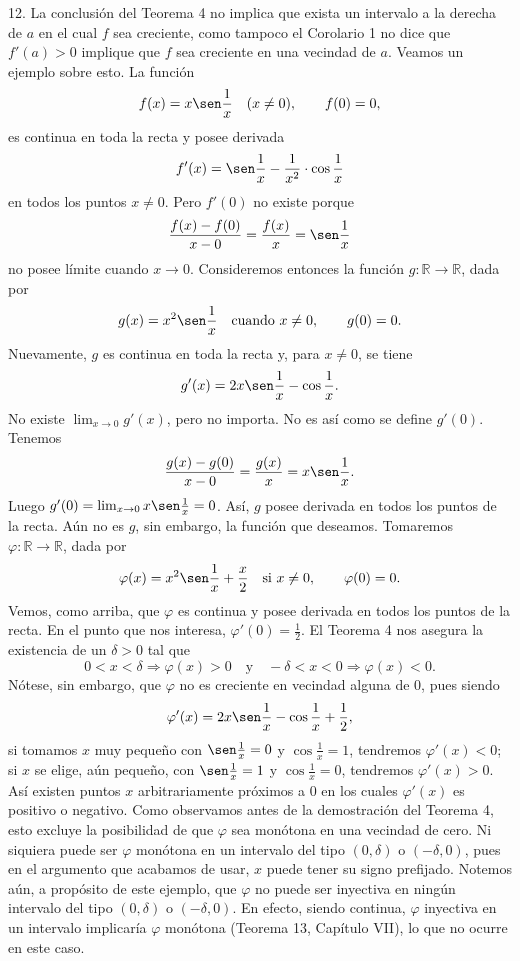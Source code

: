 \documentclass[12pt,oneside]{book}
\begin{document}
12. La conclusión del Teorema 4 no implica que exista un intervalo a la derecha de \( a \) en el cual \( f \) sea creciente, como tampoco el Corolario 1 no dice que \( f'(a) > 0 \) implique que \( f \) sea creciente en una vecindad de \( a \). Veamos un ejemplo sobre esto. La función
\[
f(x) = x \sen \frac{1}{x} \quad (x \neq 0), \qquad f(0) = 0,
\]
es continua en toda la recta y posee derivada
\[
f'(x) = \sen \frac{1}{x} - \frac{1}{x^2} \cdot \cos \frac{1}{x}
\]
en todos los puntos \( x \neq 0 \). Pero \( f'(0) \) no existe porque
\[
\frac{f(x) - f(0)}{x - 0} = \frac{f(x)}{x} = \sen \frac{1}{x}
\]
no posee límite cuando \( x \to 0 \). Consideremos entonces la función \( g: \mathbb{R} \to \mathbb{R} \), dada por
\[
g(x) = x^2 \sen \frac{1}{x} \quad \text{cuando } x \neq 0, \qquad g(0) = 0.
\]
Nuevamente, \( g \) es continua en toda la recta y, para \( x \neq 0 \), se tiene
\[
g'(x) = 2x \sen \frac{1}{x} - \cos \frac{1}{x}.
\]
No existe \( \lim_{x \to 0} g'(x) \), pero no importa. No es así como se define \( g'(0) \). Tenemos
\[
\frac{g(x) - g(0)}{x - 0} = \frac{g(x)}{x} = x \sen \frac{1}{x}.
\]
Luego \( g'(0) = \lim_{x \to 0} x \sen \frac{1}{x} = 0 \). Así, \( g \) posee derivada en todos los puntos de la recta. Aún no es \( g \), sin embargo, la función que deseamos. Tomaremos \( \varphi: \mathbb{R} \to \mathbb{R} \), dada por
\[
\varphi(x) = x^2 \sen \frac{1}{x} + \frac{x}{2} \quad \text{si } x \neq 0, \qquad \varphi(0) = 0.
\]
Vemos, como arriba, que \( \varphi \) es continua y posee derivada en todos los puntos de la recta. En el punto que nos interesa, \( \varphi'(0) = \frac{1}{2} \). El Teorema 4 nos asegura la existencia de un \( \delta > 0 \) tal que
\[
0 < x < \delta \Rightarrow \varphi(x) > 0 \quad \text{y} \quad -\delta < x < 0 \Rightarrow \varphi(x) < 0.
\]
Nótese, sin embargo, que \( \varphi \) no es creciente en vecindad alguna de \( 0 \), pues siendo
\[
\varphi'(x) = 2x \sen \frac{1}{x} - \cos \frac{1}{x} + \frac{1}{2},
\]
si tomamos \( x \) muy pequeño con \( \sen \frac{1}{x} = 0 \) y \( \cos \frac{1}{x} = 1 \), tendremos \( \varphi'(x) < 0 \); si \( x \) se elige, aún pequeño, con \( \sen \frac{1}{x} = 1 \) y \( \cos \frac{1}{x} = 0 \), tendremos \( \varphi'(x) > 0 \). Así existen puntos \( x \) arbitrariamente próximos a \( 0 \) en los cuales \( \varphi'(x) \) es positivo o negativo. Como observamos antes de la demostración del Teorema 4, esto excluye la posibilidad de que \( \varphi \) sea monótona en una vecindad de cero. Ni siquiera puede ser \( \varphi \) monótona en un intervalo del tipo \( (0, \delta) \) o \( (-\delta, 0) \), pues en el argumento que acabamos de usar, \( x \) puede tener su signo prefijado. Notemos aún, a propósito de este ejemplo, que \( \varphi \) no puede ser inyectiva en ningún intervalo del tipo \( (0, \delta) \) o \( (-\delta, 0) \). En efecto, siendo continua, \( \varphi \) inyectiva en un intervalo implicaría \( \varphi \) monótona (Teorema 13, Capítulo VII), lo que no ocurre en este caso.
\end{document}
